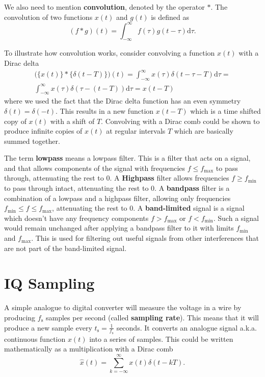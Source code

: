 \documentclass[a4paper,12pt,twoside,openright]{report}
\begin{document}
We also need to mention \textbf{convolution}, denoted by the operator $\ast$. The convolution of two functions $x(t)$ and $g(t)$ is defined as
$$(f \ast g)(t) = \int_{-\infty}^{\infty} f(\tau) g(t - \tau) \text{d} \tau .$$

To illustrate how convolution works, consider convolving a function $x(t)$ with a Dirac delta
\begin{multline}
\big( \{ x(t) \} \ast \{ \delta(t-T) \} \big)(t) =  \int_{-\infty}^{\infty} x(\tau) \delta(t - \tau - T ) \text{d} \tau = \\
\int_{-\infty}^{\infty} x(\tau) \delta( \tau - ( t -T) ) \text{d} \tau = x(t-T)
\end{multline}
where we used the fact that the Dirac delta function has an even symmetry $\delta(t) = \delta(-t)$. This results in a new function $x(t-T)$ which is a time shifted copy of $x(t)$ with a shift of $T$. Convolving with a Dirac comb could be shown to produce infinite copies of $x(t)$ at regular intervals $T$ which are basically summed together.

The term \textbf{lowpass} means a lowpass filter. This is a filter that acts on a signal, and that allows components of the signal with frequencies $f \leq f_\text{max}$ to pass through, attenuating the rest to 0. A \textbf{Highpass} filter allows frequencies $f \geq f_\text{min}$ to pass through intact, attenuating the rest to 0. A \textbf{bandpass} filter is a combination of a lowpass and a highpass filter, allowing only frequencies $f_\text{min} \leq f \leq f_\text{max}$, attenuating the rest to 0. A \textbf{band-limited} signal is a signal which doesn't have any frequency components $f > f_\text{max}$ or $f < f_\text{min}$. Such a signal would remain unchanged after applying a bandpass filter to it with limits $f_\text{min}$ and $f_\text{max}$. This is used for filtering out useful signals from other interferences that are not part of the band-limited signal.

\section{IQ Sampling} 
\label{sec:IQSampling}

A simple analogue to digital converter will measure the voltage in a wire by producing $f_\text{s}$ samples per second (called \textbf{sampling rate}). This means that it will produce a new sample every $t_\text{s} = \frac{1}{f_\text{s}}$ seconds. It converts an analogue signal a.k.a. continuous function $x(t)$ into a series of samples. This could be written mathematically as a multiplication with a Dirac comb
\begin{equation}
\label{eq:sampling}
\hat{x}(t) = \sum_{k=-\infty}^{\infty} x(t) \delta(t - kT) .
\end{equation}
\end{document}
